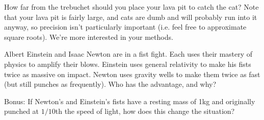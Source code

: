 \documentclass[11pt]{exam}
\begin{document}
\begin{questions}
How far from the trebuchet should you place your lava pit to catch the cat? Note
that your lava pit is fairly large, and cats are dumb and will probably run into
it anyway, so precision isn't particularly important (i.e. feel free to approximate square
roots). We're more interested in
your methods.







\newpage
\question[3] Albert Einstein and Isaac Newton are in a fist fight. Each uses their
mastery of physics to amplify their blows. Einstein uses general relativity to
make his fists twice as massive on impact. Newton uses gravity wells to make them twice as
fast (but still punches as frequently). Who has the advantage, and why?
\vfill





\question[3] Bonus: If Newton's and Einstein's fists have a resting mass of 1kg and
originally punched at $1/10$th the speed of light, how does this change the situation?
\vfill


\end{questions}
\end{document}
